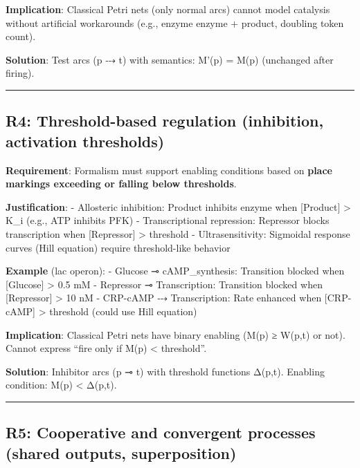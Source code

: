 \textbf{Implication}: Classical Petri nets (only normal arcs) cannot
model catalysis without artificial workarounds (e.g., enzyme \textrightarrow enzyme +
product, doubling token count).

\textbf{Solution}: Test arcs (p ⤏ t) with semantics: M'(p) = M(p)
(unchanged after firing).

\begin{center}\rule{0.5\linewidth}{0.5pt}\end{center}

\hypertarget{r4-threshold-based-regulation-inhibition-activation-thresholds}{%
\subsection{\texorpdfstring{\textbf{R4: Threshold-based regulation}
(inhibition, activation
thresholds)}{R4: Threshold-based regulation (inhibition, activation thresholds)}}\label{r4-threshold-based-regulation-inhibition-activation-thresholds}}

\textbf{Requirement}: Formalism must support enabling conditions based
on \textbf{place markings exceeding or falling below thresholds}.

\textbf{Justification}: - Allosteric inhibition: Product inhibits enzyme
when {[}Product{]} \textgreater{} K\_i (e.g., ATP inhibits PFK) -
Transcriptional repression: Repressor blocks transcription when
{[}Repressor{]} \textgreater{} threshold - Ultrasensitivity: Sigmoidal
response curves (Hill equation) require threshold-like behavior

\textbf{Example} (lac operon): - Glucose ⊸ cAMP\_synthesis: Transition
blocked when {[}Glucose{]} \textgreater{} 0.5 mM - Repressor ⊸
Transcription: Transition blocked when {[}Repressor{]} \textgreater{} 10
nM - CRP-cAMP ⤏ Transcription: Rate enhanced when {[}CRP-cAMP{]}
\textgreater{} threshold (could use Hill equation)

\textbf{Implication}: Classical Petri nets have binary enabling (M(p) ≥
W(p,t) or not). Cannot express ``fire only if M(p) \textless{}
threshold''.

\textbf{Solution}: Inhibitor arcs (p ⊸ t) with threshold functions
Δ(p,t). Enabling condition: M(p) \textless{} Δ(p,t).

\begin{center}\rule{0.5\linewidth}{0.5pt}\end{center}

\hypertarget{r5-cooperative-and-convergent-processes-shared-outputs-superposition}{%
\subsection{\texorpdfstring{\textbf{R5: Cooperative and convergent
processes} (shared outputs,
superposition)}{R5: Cooperative and convergent processes (shared outputs, superposition)}}\label{r5-cooperative-and-convergent-processes-shared-outputs-superposition}}

